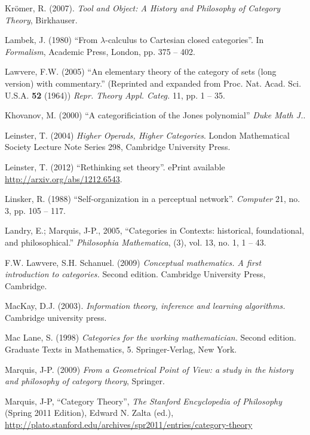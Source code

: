 \documentclass[a4paper]{book}
\theoremstyle{myth}
\begin{document}
\begin{russian}
\begin{thebibliography}{SGWB}
 Kr\"{o}mer, R. (2007). {\em Tool and Object: A History and Philosophy of Category Theory}, Birkhauser.

 Lambek, J. (1980) “From $\lambda$-calculus to Cartesian closed categories”. In {\em Formalism}, Academic Press, London, pp. 375 -- 402.

 Lawvere, F.W. (2005) “An elementary theory of the category of sets (long version) with
   commentary.” (Reprinted and expanded from Proc. Nat. Acad. Sci. U.S.A. {\bf 52}
   (1964)) {\em Repr. Theory Appl. Categ.} 11, pp. 1 -- 35.
   
 Khovanov, M. (2000) “A categorificiation of the Jones polynomial” {\em Duke Math J.}.

 Leinster, T. (2004) {\em Higher Operads, Higher Categories}. London Mathematical Society Lecture Note Series 298, Cambridge University Press.

 Leinster, T. (2012) “Rethinking set theory”. ePrint available \url{http://arxiv.org/abs/1212.6543}.

 Linsker, R. (1988) “Self-organization in a perceptual network”. {\em Computer} 21, no. 3, pp. 105 -- 117.

 Landry, E.; Marquis, J-P., 2005, “Categories in Contexts: historical, foundational, and philosophical.” {\em Philosophia Mathematica}, (3), vol. 13, no. 1, 1 -- 43.

 F.W. Lawvere, S.H. Schanuel. (2009) {\em Conceptual mathematics. 
A first introduction to categories.} Second edition. Cambridge University Press, Cambridge.

 MacKay, D.J. (2003). {\em Information theory, inference and learning algorithms.} Cambridge university press.

 Mac Lane, S. (1998) {\em Categories for the working mathematician.} Second edition. Graduate Texts in Mathematics, 5. Springer-Verlag, New York.

 Marquis, J-P. (2009) {\em From a Geometrical Point of View: a study in the history and philosophy of category theory}, Springer.

 Marquis, J-P, “Category Theory”, {\em The Stanford Encyclopedia of Philosophy} (Spring 2011 Edition), Edward N. Zalta (ed.), \url{http://plato.stanford.edu/archives/spr2011/entries/category-theory}


\end{thebibliography}
\end{russian}
\end{document}
